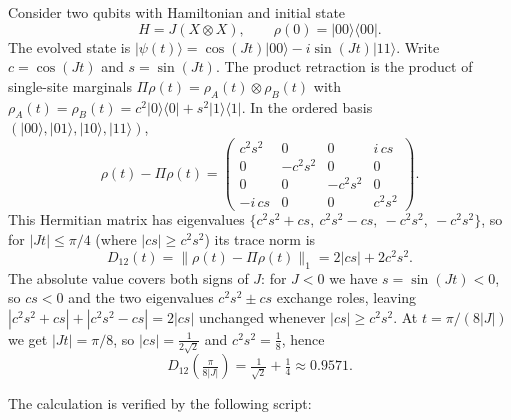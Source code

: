\documentclass[
  11pt,
]{article}
\begin{document}
Consider two qubits with Hamiltonian and initial state
\[H = J(X \otimes X), \qquad \rho(0) = |00\rangle\langle 00|.\]
The evolved state is \(|\psi(t)\rangle = \cos(Jt)|00\rangle - i\sin(Jt)|11\rangle\). Write \(c=\cos(Jt)\) and \(s=\sin(Jt)\). The product retraction is the product of single-site marginals \(\Pi\rho(t)=\rho_A(t)\otimes\rho_B(t)\) with \(\rho_A(t)=\rho_B(t)=c^2|0\rangle\langle0|+s^2|1\rangle\langle1|\). In the ordered basis \((|00\rangle,|01\rangle,|10\rangle,|11\rangle)\),
\[\rho(t)-\Pi\rho(t)=\begin{pmatrix} c^2s^2 & 0 & 0 & i\,cs\\ 0 & -c^2s^2 & 0 & 0\\ 0 & 0 & -c^2s^2 & 0\\ -i\,cs & 0 & 0 & c^2s^2 \end{pmatrix}.\]
This Hermitian matrix has eigenvalues \(\{c^2s^2+cs,\ c^2s^2-cs,\ -c^2s^2,\ -c^2s^2\}\), so for \(|Jt|\le\pi/4\) (where \(|cs|\ge c^2s^2\)) its trace norm is
\[D_{12}(t)=\lVert\rho(t)-\Pi\rho(t)\rVert_1 = 2|cs|+2c^2s^2.\]
The absolute value covers both signs of \(J\): for \(J<0\) we have \(s=\sin(Jt)<0\), so \(cs<0\) and the two eigenvalues \(c^2s^2\pm cs\) exchange roles, leaving \(|c^2s^2+cs|+|c^2s^2-cs|=2|cs|\) unchanged whenever \(|cs|\ge c^2s^2\). At \(t=\pi/(8|J|)\) we get \(|Jt|=\pi/8\), so \(|cs|=\tfrac{1}{2\sqrt2}\) and \(c^2s^2=\tfrac18\), hence
\[D_{12}\!\left(\tfrac{\pi}{8|J|}\right)=\tfrac{1}{\sqrt2}+\tfrac14\approx 0.9571.\]

The calculation is verified by the following script:
\end{document}
